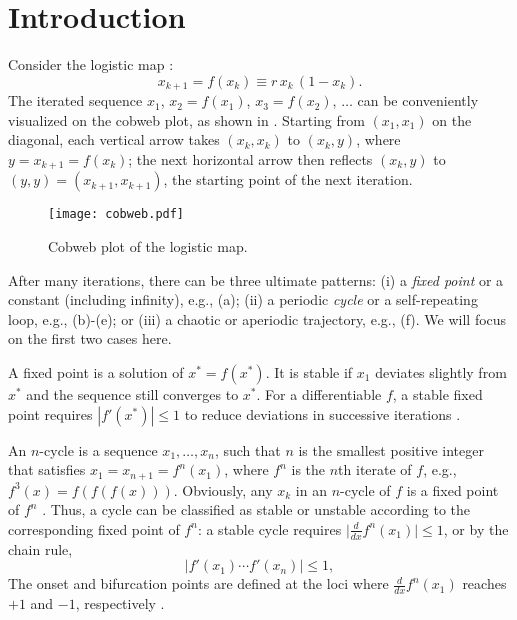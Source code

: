 \documentclass[twocolumn]{revtex4-1}
\begin{document}
%
%
\section{Introduction}
%
%

Consider the logistic map \cite{may, strogatz}:
%
\begin{equation}
  x_{k+1} = f(x_k) \equiv r \, x_k \, ( 1 - x_k ).
\label{eq:logmap}
\end{equation}
%
The iterated  sequence $x_1$,
  $x_2 = f(x_1)$,
  $x_3 = f(x_2)$, $\ldots$
can be conveniently visualized on the cobweb plot,
  as shown in .
%
Starting from $(x_1, x_1)$ on the diagonal,
  each vertical arrow takes $(x_k, x_k)$ to $(x_k, y)$,
  where $y = x_{k+1} = f(x_k)$;
the next horizontal arrow then reflects $(x_k, y)$ to
  $(y, y) = (x_{k+1}, x_{k+1})$,
  the starting point of the next iteration.
%
\begin{figure}[h]
  \begin{minipage}{\linewidth}
    \begin{center}
        \texttt{[image: cobweb.pdf]}
    \end{center}
  \end{minipage}%
  \caption{\label{fig:cobweb}
  Cobweb plot of the logistic map.}
\end{figure}
%
%
After many iterations, there can be three ultimate patterns:
  (i) a \emph{fixed point} or a constant (including infinity),
      e.g., (a);
  (ii) a periodic \emph{cycle} or a self-repeating loop,
      e.g., (b)-(e);
or
  (iii) a chaotic or aperiodic trajectory,
      e.g., (f).
We will focus on the first two cases here.



A fixed point is a solution of $x^* = f(x^*)$.
%
It is stable if $x_1$ deviates slightly from $x^*$
  and the sequence still converges to $x^*$.
%
For a differentiable $f$,
  a stable fixed point requires $|f'(x^*)| \le 1$
  to reduce deviations in successive iterations \cite{strogatz, hao}.


An $n$-cycle is a sequence $x_1, \dots, x_n$,
  such that $n$ is the smallest positive integer
  that satisfies $x_1 = x_{n+1} = f^n(x_1)$,
  where $f^n$ is the $n$th iterate of $f$,
  e.g., $f^3(x) = f(f(f(x)))$.
Obviously, any $x_k$ in an $n$-cycle of $f$ is a fixed point of $f^n$
%
\big[but the converse is untrue, for a fixed point of $f^n$
  can also be a fixed point of $f^d$ for a divisor $d$ of $n$:
  if $f^d(x) = x$, then $f^n(x) = f^d(\cdots f^d(x)\cdots) = x$\big].
%
%
Thus, a cycle can be classified as stable or unstable
  according to the corresponding fixed point of $f^n$:
  a stable cycle requires
  $\big| \frac {d} {dx} f^n(x_1) \big| \le 1$,
  or by the chain rule,
%
%
%
\begin{equation}
  \Big| f'(x_1) \cdots f'(x_n) \Big| \le 1,
\label{eq:der}
\end{equation}
%
%
The onset and bifurcation points
  are defined at the loci
  where $\frac {d} {dx} f^n(x_1)$ reaches $+1$ and $-1$,
  respectively \cite{strogatz, hao}.
%
%
%
\end{document}
